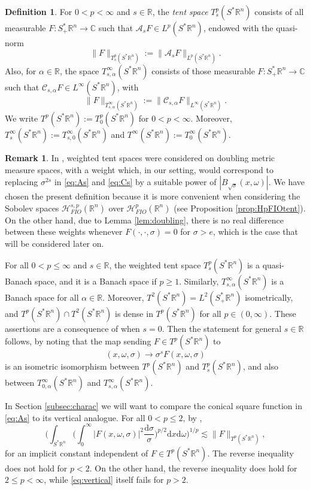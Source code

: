\documentclass{amsart}
\newcommand {\A}{{\mathcal{A}}}
\newcommand {\C}{{\mathbb C}}
\newcommand {\ud}{\mathrm{d}}
\newcommand {\Hp}{\mathcal{H}^{p}_{FIO}(\Rn)}
\newcommand {\Hps}{\mathcal{H}^{s,p}_{FIO}(\Rn)}
\newcommand {\R}{\mathbb R}
\newcommand {\Rn}{\mathbb{R}^{n}}
\newcommand {\Sp}{S^{*}\Rn}
\newcommand {\Spp}{S^{*}_{+}\Rn}
\newcommand {\w}{\omega}
\theoremstyle{definition}
\newtheorem{definition}[theorem]{Definition}
\newtheorem{remark}[theorem]{Remark}
\numberwithin{equation}{section}
\begin{document}
\begin{definition}\label{def:tentspace}
For $0<p<\infty$ and $s\in\R$, the \emph{tent space} $T^{p}_{s}(\Sp)$ consists of all measurable $F:\Spp\to\C$ such that $\A_{s} F\in L^{p}(\Sp)$, endowed with the quasi-norm
\[
\|F\|_{T^{p}_{s}(\Sp)}:=\|\A_{s} F\|_{L^{p}(\Sp)}.
\]
Also, for $\alpha\in\R$, the space $T^{\infty}_{s,\alpha}(\Sp)$ consists of those measurable $F:\Spp\to\C$ such that $\mathcal{C}_{s,\alpha}F\in L^{\infty}(\Sp)$, with 
\[
\|F\|_{T^{\infty}_{s,\alpha}(\Sp)}:=\|\mathcal{C}_{s,\alpha}F\|_{L^{\infty}(\Sp)}.
\]
We write $T^{p}(\Sp):=T^{p}_{0}(\Sp)$ for $0<p<\infty$. Moreover, $T^{\infty}_{s}(\Sp):=T^{\infty}_{s,0}(\Sp)$ and $T^{\infty}(\Sp):=T^{\infty}_{0}(\Sp)$. 
\end{definition}


\begin{remark}\label{rem:tentweight}
In \cite{Amenta18}, weighted tent spaces were considered on doubling metric measure spaces, with a weight which, in our setting, would correspond to replacing $\sigma^{2s}$ in \eqref{eq:As} and \eqref{eq:Cs} by a suitable power of $|B_{\sqrt{\sigma}}(x,\w)|$. We have chosen the present definition because it is more convenient when considering the Sobolev spaces $\Hps$ over $\Hp$ (see Proposition \ref{prop:HpFIOtent}). On the other hand, due to Lemma \ref{lem:doubling}, there is no real difference between these weights whenever $F(\cdot,\cdot,\sigma)=0$ for $\sigma>e$, which is the case that will be considered later on.
\end{remark}

For all $0<p\leq \infty$ and $s\in\R$, the weighted tent space $T^{p}_{s}(\Sp)$ is a quasi-Banach space, and it is a Banach space if $p\geq 1$. Similarly, $T^{\infty}_{s,\alpha}(\Sp)$ is a Banach space for all $\alpha\in\R$. Moreover, $T^{2}(\Sp)=L^{2}(\Spp)$ isometrically, and $T^{p}(\Sp)\cap T^{2}(\Sp)$ is dense in $T^{p}(\Sp)$ for all $p\in(0,\infty)$. These assertions are a consequence of \cite[Proposition 1.4]{Amenta18} when $s=0$. Then the statement for general $s\in\R$ follows, by noting that the map sending $F\in T^{p}(\Sp)$ to
\[
(x,\w,\sigma)\to \sigma^{s}F(x,\w,\sigma)
\]
is an isometric isomorphism between $T^{p}(\Sp)$ and $T^{p}_{s}(\Sp)$, and also between $T^{\infty}_{0,\alpha}(\Sp)$ and $T^{\infty}_{s,\alpha}(\Sp)$.

In Section \ref{subsec:charac} we will want to compare the conical square function in \eqref{eq:As} to its vertical analogue. For all $0<p\leq 2$, by \cite[Proposition 2.1 and Remark 2.2]{AuHoMa12},
\begin{equation}\label{eq:vertical}
\Big(\int_{\Sp}\Big(\int_{0}^{\infty}|F(x,\w,\sigma)|^{2}\frac{\ud\sigma}{\sigma}\Big)^{p/2}\ud x\ud\w\Big)^{1/p}\lesssim \|F\|_{T^{p}(\Sp)},
\end{equation}
for an implicit constant independent of $F\in T^{p}(\Sp)$. The reverse inequality does not hold for $p<2$. On the other hand, the reverse inequality does hold for $2\leq p<\infty$, while \eqref{eq:vertical} itself fails for $p>2$. 
\end{document}
